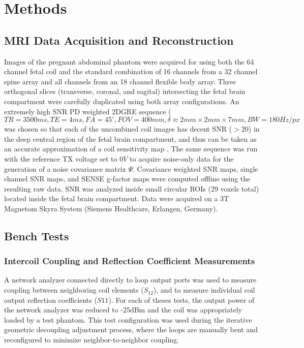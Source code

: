 \chapter{Methods}

\section{MRI Data Acquisition and Reconstruction}
Images of the pregnant abdominal phantom were acquired for using both the 64 channel fetal coil and the standard
combination of 16 channels from a 32 channel spine array and all channels from an 18 channel flexible body array. Three
orthogonal slices (transverse, coronal, and sagital) intersecting the fetal brain compartment were carefully duplicated
using both array configurations. An extremely high SNR PD weighted 2DGRE sequence ($TR=3500ms, TE=4ms, FA=45^{\circ},
FOV=400mm, \delta \approx 2mm \times 2mm \times 7mm, BW=180Hz/px$ was chosen so that each of the uncombined coil images
has decent SNR ($>20$) in the deep central region of the fetal brain compartment, and thus can be taken as an accurate
approximation of a coil sensitivity map \cite{Roemer90}. The same sequence was run with the reference TX voltage set to
$0V$ to acquire noise-only data for the generation of a noise covariance matrix $\Psi$. Covariance weighted SNR maps,
single channel SNR maps, and SENSE g-factor maps were computed offline using the resulting raw data. SNR was analyzed
inside small circular ROIs (29 voxels total) located inside the fetal brain compartment. Data were acquired on a 3T
Magnetom Skyra System (Siemens Healthcare, Erlangen, Germany).

\section{Bench Tests}
\subsection{Intercoil Coupling and Reflection Coefficient Measurements}
A network analyzer connected directly to loop output ports was used to measure coupling between neighboring coil
elements ($S_{12}$), and to measure individual coil output reflection coefficients ($S{11}$). For each of theses tests,
the output power of the network analyzer was reduced to -25dBm and the coil was appropriately loaded by a test phantom.
This test configuration was used during the iterative geometric decoupling adjustment process, where the loops are
manually bent and reconfigured to minimize neighbor-to-neighbor coupling.

